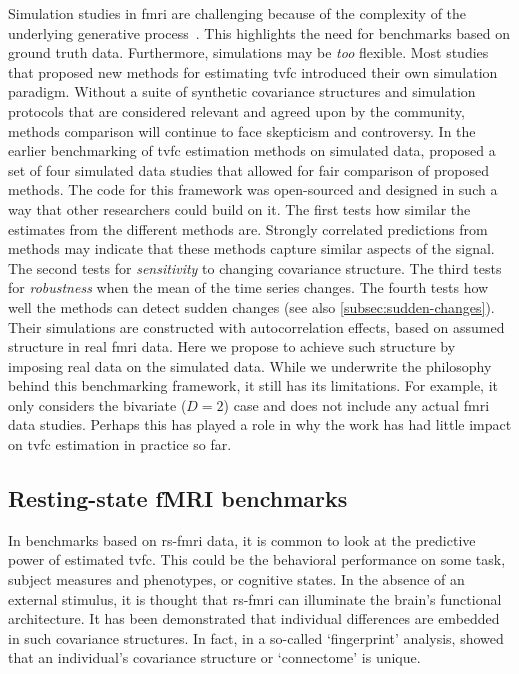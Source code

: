 Simulation studies in \gls{fmri} are challenging because of the complexity of the underlying generative process~\parencite{Welvaert2014}.
This highlights the need for benchmarks based on ground truth data.
%
Furthermore, simulations may be \emph{too} flexible.
Most studies that proposed new methods for estimating \gls{tvfc} introduced their own simulation paradigm.
Without a suite of synthetic covariance structures and simulation protocols that are considered relevant and agreed upon by the community, methods comparison will continue to face skepticism and controversy.
%
In the earlier benchmarking of \gls{tvfc} estimation methods on simulated data, \textcite{Thompson2018} proposed a set of four simulated data studies that allowed for fair comparison of proposed methods.
The code for this framework was open-sourced and designed in such a way that other researchers could build on it.
The first tests how similar the estimates from the different methods are.
Strongly correlated predictions from methods may indicate that these methods capture similar aspects of the signal.
The second tests for \emph{sensitivity} to changing covariance structure.
The third tests for \emph{robustness} when the mean of the time series changes.
The fourth tests how well the methods can detect sudden changes (see also \cref{subsec:sudden-changes}).
Their simulations are constructed with autocorrelation effects, based on assumed structure in real \gls{fmri} data.
Here we propose to achieve such structure by imposing real data on the simulated data.
While we underwrite the philosophy behind this benchmarking framework, it still has its limitations.
For example, it only considers the bivariate ($D = 2$) case and does not include any actual \gls{fmri} data studies.
Perhaps this has played a role in why the work has had little impact on \gls{tvfc} estimation in practice so far.

\subsection{Resting-state fMRI benchmarks}

In benchmarks based on \gls{rs-fmri} data, it is common to look at the predictive power of estimated \gls{tvfc}.
This could be the behavioral performance on some task, subject measures and phenotypes, or cognitive states.
In the absence of an external stimulus, it is thought that \gls{rs-fmri} can illuminate the brain's functional architecture.
It has been demonstrated that individual differences are embedded in such covariance structures.
In fact, in a so-called `fingerprint' analysis, \textcite{Finn2015} showed that an individual's covariance structure or `connectome' is unique.

